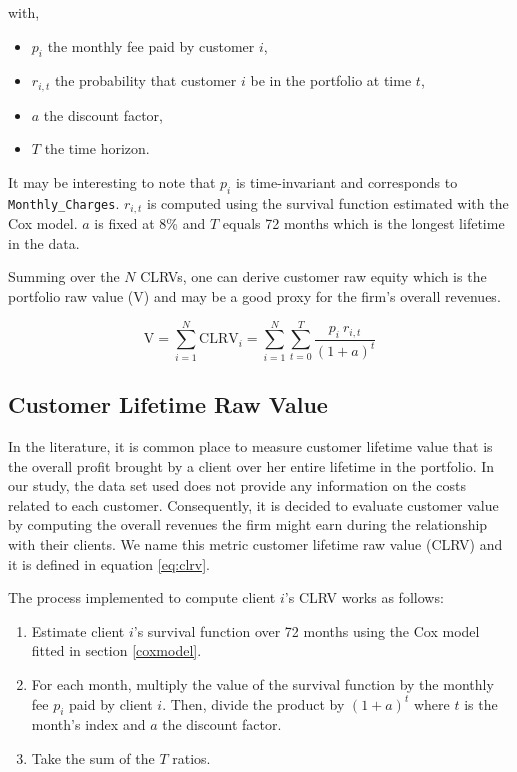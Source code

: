 \documentclass[
]{book}
\providecommand{\tightlist}{%
  \setlength{\itemsep}{0pt}\setlength{\parskip}{0pt}}
\begin{document}
with,

\begin{itemize}
\tightlist
\item
  \(p_i\) the monthly fee paid by customer \(i\),
\item
  \(r_{i,t}\) the probability that customer \(i\) be in the portfolio at time \(t\),
\item
  \(a\) the discount factor,
\item
  \(T\) the time horizon.
\end{itemize}

It may be interesting to note that \(p_i\) is time-invariant and corresponds to \texttt{Monthly\_Charges}. \(r_{i,t}\) is computed using the survival function estimated with the Cox model. \(a\) is fixed at 8\% and \(T\) equals 72 months which is the longest lifetime in the data.

Summing over the \(N\) CLRVs, one can derive customer raw equity which is the portfolio raw value (V) and may be a good proxy for the firm's overall revenues.

\begin{equation}
    \text{V} = \sum_{i=1}^{N} \text{CLRV}_i = \sum_{i=1}^{N} \sum_{t=0}^{T} \frac{p_i \ r_{i,t}}{(1+a)^t} 
    \label{eq:cre}
\end{equation}

\hypertarget{customer-lifetime-raw-value}{%
\subsection{Customer Lifetime Raw Value}\label{customer-lifetime-raw-value}}

In the literature, it is common place to measure customer lifetime value that is the overall profit brought by a client over her entire lifetime in the portfolio. In our study, the data set used does not provide any information on the costs related to each customer. Consequently, it is decided to evaluate customer value by computing the overall revenues the firm might earn during the relationship with their clients. We name this metric customer lifetime raw value (CLRV) and it is defined in equation \eqref{eq:clrv}.

The process implemented to compute client \(i\)'s CLRV works as follows:

\begin{enumerate}
\def\labelenumi{\arabic{enumi}.}
\tightlist
\item
  Estimate client \(i\)'s survival function over 72 months using the Cox model fitted in section \ref{coxmodel}.
\item
  For each month, multiply the value of the survival function by the monthly fee \(p_i\) paid by client \(i\). Then, divide the product by \((1 + a)^t\) where \(t\) is the month's index and \(a\) the discount factor.
\item
  Take the sum of the \(T\) ratios.
\end{enumerate}
\end{document}

